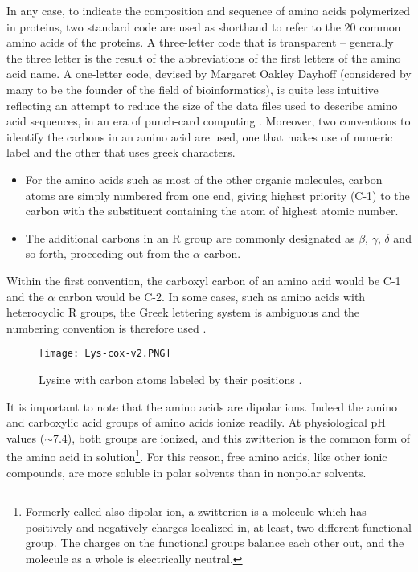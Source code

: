In any case, to indicate the composition and sequence of amino acids polymerized in proteins, two standard code are used as shorthand to refer to the 20 common amino acids of the proteins.
A three-letter code that is transparent -- generally the three letter is the result of the abbreviations of the first letters of the amino acid name. A one-letter code, devised by Margaret Oakley Dayhoff (considered by many to be the founder of the field of bioinformatics), is quite less intuitive reflecting an attempt to reduce the size of the data files used to describe amino acid sequences, in an era of punch-card computing
\cite{nelson2008lehninger}. 
Moreover, two conventions to identify the carbons in an amino acid are used, one that makes use of numeric label and the other that uses greek characters.
\begin{itemize}
\item For the amino acids such as most of the other organic molecules, carbon atoms are simply numbered from one end, giving highest priority (C-1) to the carbon with the substituent containing the atom of highest atomic number.
\item The additional carbons in an R group are commonly designated as $\beta$, $\gamma$, $\delta$ and so forth, proceeding out from the  $\alpha$ carbon.
\end{itemize} 
Within the first convention, the carboxyl carbon of an amino acid would be C-1 and the  $\alpha$ carbon would be C-2. In some cases, such as amino acids with heterocyclic R groups, the Greek lettering system is ambiguous and the numbering convention is therefore used \cite{nelson2008lehninger}.

\begin{figure}[h]
\centering
\begin{minipage}[t]{0.8\textwidth}
\centering
\texttt{[image: Lys-cox-v2.PNG]}

\caption{\small{Lysine with carbon atoms labeled by their positions
\cite{nelson2008lehninger}.}}

\label{fig:Lysine}
\end{minipage} 
\end{figure}

It is important to note that the amino acids are dipolar ions. Indeed the amino and carboxylic acid groups of amino acids ionize readily. 
At physiological pH values ($\sim$7.4), both groups are ionized, and this zwitterion is the common form of the amino acid in solution\footnote{Formerly called also dipolar ion, a zwitterion is a molecule which has positively and negatively charges localized in, at least, two different functional group. The charges on the functional groups balance each other out, and the molecule as a whole is electrically neutral.}. For this reason, free amino acids, like other ionic compounds, are more soluble in polar solvents than in nonpolar solvents. 

